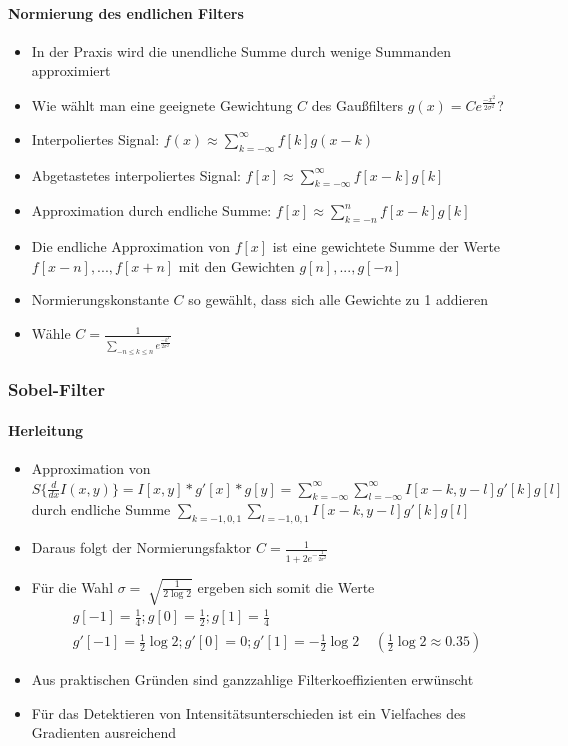 \documentclass[12pt, a4paper, oneside]{article}
\begin{document}
\paragraph*{Normierung des endlichen Filters}
\begin{itemize}
    \item In der Praxis wird die unendliche Summe durch wenige Summanden approximiert
    \item Wie wählt man eine geeignete Gewichtung $C$ des Gaußfilters $g(x)=Ce^{\frac{-x^2}{2\sigma^2}}$?
    \item Interpoliertes Signal: $f(x)\approx \sum\limits_{k=-\infty}^{\infty}f[k]g(x-k)$
    \item Abgetastetes interpoliertes Signal: $f[x]\approx \sum\limits_{k=-\infty}^{\infty}f[x-k]g[k]$
    \item Approximation durch endliche Summe: $f[x]\approx \sum\limits_{k=-n}^{n}f[x-k]g[k]$
    \item Die endliche Approximation von $f[x]$ ist eine gewichtete Summe der Werte $f[x-n],...,f[x+n]$ mit den Gewichten $g[n],...,g[-n]$
    \item Normierungskonstante $C$ so gewählt, dass sich alle Gewichte zu 1 addieren
    \item Wähle $C=\frac{1}{\sum\limits_{-n\le k\le n}e^{\frac{-k^2}{2\sigma^2}}}$
\end{itemize}

\subsubsection{Sobel-Filter}
\paragraph*{Herleitung}
\begin{itemize}
    \item Approximation von $S\{\frac{d}{dx}I(x,y)\}=I[x,y]*g'[x]*g[y]=\sum\limits_{k=-\infty}^{\infty}\sum\limits_{l=-\infty}^{\infty}I[x-k,y-l]g'[k]g[l]$ durch endliche Summe $\sum\limits_{k=-1,0,1}^{}\sum\limits_{l=-1,0,1}^{}I[x-k,y-l]g'[k]g[l]$
    \item Daraus folgt der Normierungsfaktor $C=\frac{1}{1+2e^{-\frac{1}{2\sigma^2}}}$
    \item Für die Wahl $\sigma = \sqrt[]{\frac{1}{2\log 2}}$ ergeben sich somit die Werte
    \begin{align*}
        & g[-1]=\frac{1}{4}; g[0]=\frac{1}{2}; g[1]=\frac{1}{4} \\
        & g'[-1]=\frac{1}{2}\log 2; g'[0]=0; g'[1]=-\frac{1}{2}\log 2\;\;\;\;(\frac{1}{2}\log 2\approx 0.35)
    \end{align*}
    \item Aus praktischen Gründen sind ganzzahlige Filterkoeffizienten erwünscht
    \item Für das Detektieren von Intensitätsunterschieden ist ein Vielfaches des Gradienten ausreichend
\end{itemize}
\end{document}
